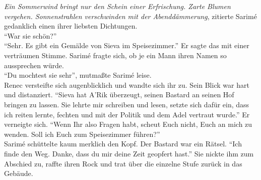 \textit{Ein Sommerwind bringt nur den Schein einer Erfrischung. Zarte Blumen vergehen. 
Sonnenstrahlen verschwinden mit der Abenddämmerung}, zitierte Sarimé gedanklich einen ihrer 
liebsten Dichtungen.\\
``War sie schön?''\\
``Sehr. Es gibt ein Gemälde von Sieva im Speisezimmer.'' Er sagte das mit einer verträumen Stimme. 
Sarimé fragte sich, ob je ein Mann ihren Namen so aussprechen würde. \\
``Du mochtest sie sehr'', mutmaßte Sarimé leise.\\
Renec versteifte sich augenblicklich und wandte sich ihr zu. Sein Blick war hart und distanziert. 
``Sieva hat A'Rik überzeugt, seinen Bastard an seinen Hof bringen zu lassen. Sie lehrte mir 
schreiben und lesen, setzte sich dafür ein, dass ich reiten lernte, fechten und mit der Politik und 
dem Adel vertraut wurde.'' Er verneigte sich. ``Wenn Ihr also Fragen habt, scheut Euch nicht, Euch 
an mich zu wenden. Soll ich Euch zum Speisezimmer führen?''\\
Sarimé schüttelte kaum merklich den Kopf. Der Bastard war ein Rätsel. ``Ich finde den Weg. Danke, 
dass du mir deine Zeit geopfert hast.'' Sie nickte ihm zum Abschied zu, raffte ihren Rock und trat 
über die einzelne Stufe zurück in das Gebäude.\\

